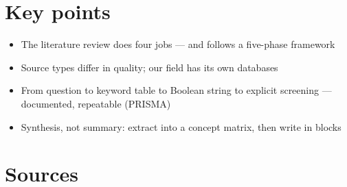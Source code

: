 \documentclass[11pt,a4paper,british,twoside=false,headings=small,chapterprefix=false,numbers=noenddot]{scrbook}
\begin{document}
\section*{Key points}
\begin{itemize}
  \item The literature review does four jobs --- and follows a five-phase framework
  \item Source types differ in quality; our field has its own databases
  \item From question to keyword table to Boolean string to explicit screening --- documented, repeatable (PRISMA)
  \item Synthesis, not summary: extract into a concept matrix, then write in blocks
\end{itemize}

\section*{Sources}
\end{document}
